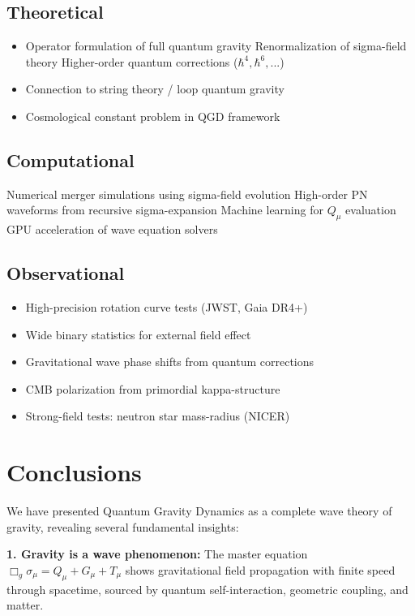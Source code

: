 \documentclass[11pt,a4paper]{article}
\theoremstyle{definition}
\theoremstyle{remark}
\begin{document}
		\subsection{Theoretical}
		
		\begin{itemize}
			\item Operator formulation of full quantum gravity
			Renormalization of sigma-field theory
			Higher-order quantum corrections ($\hbar^4, \hbar^6, ...$)
			\item Connection to string theory / loop quantum gravity
			\item Cosmological constant problem in QGD framework
		\end{itemize}
		
		\subsection{Computational}
		
			Numerical merger simulations using sigma-field evolution
			High-order PN waveforms from recursive sigma-expansion
			Machine learning for $Q_\mu$ evaluation
			GPU acceleration of wave equation solvers
		
		\subsection{Observational}
		
		\begin{itemize}
			\item High-precision rotation curve tests (JWST, Gaia DR4+)
			\item Wide binary statistics for external field effect
			\item Gravitational wave phase shifts from quantum corrections
			\item CMB polarization from primordial kappa-structure
			\item Strong-field tests: neutron star mass-radius (NICER)
		\end{itemize}
		
		\section{Conclusions}
		
		We have presented Quantum Gravity Dynamics as a complete wave theory of gravity, revealing several fundamental insights:
		
		\textbf{1. Gravity is a wave phenomenon:}
		The master equation $\Box_g\sigma_\mu = Q_\mu + G_\mu + T_\mu$ shows gravitational field propagation with finite speed through spacetime, sourced by quantum self-interaction, geometric coupling, and matter.
		
\end{document}
